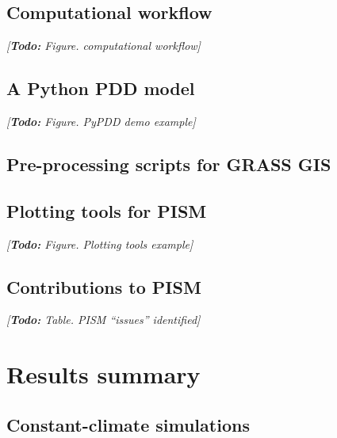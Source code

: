 \documentclass{article}
\newcommand{\todo}[1]{\emph{[\textbf{Todo:} #1]}}
\begin{document}
\subsection{Computational workflow}
\todo{Figure. computational workflow}

\subsection{A Python PDD model}
\todo{Figure. PyPDD demo example}

\subsection{Pre-processing scripts for GRASS GIS}

\subsection{Plotting tools for PISM}
\todo{Figure. Plotting tools example}

\subsection{Contributions to PISM}
\todo{Table. PISM ``issues'' identified}

\section{Results summary}

\subsection{Constant-climate simulations}
\end{document}
